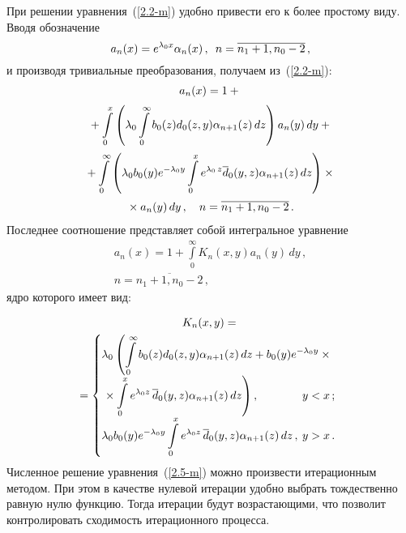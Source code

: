 \begin{multicols}{2}
При решении уравнения~(\ref{2.2-m}) удобно привести его
к более простому виду. Вводя обозначение
\begin{equation*}
a_{n}(x) = e^{\lambda_0 x} \alpha_{n}(x)\,,
\enskip  n=\overline{n_1+1,n_0-2}\,,
\end{equation*}
и производя тривиальные преобразования, получаем из~(\ref{2.2-m}):
\begin{multline}
\label{2.4-m}
a_{n}(x) = 1 +{}\\[2pt]
{}+ \int\limits_0^x \left(
\lambda_0 \int\limits_0^\infty b_0(z) d_0(z,y) \alpha_{n+1}(z)\, dz \right)
a_{n}(y)\, dy + {}\\[2pt]
{}+ \int\limits_0^\infty \left(
\lambda_0 b_0(y) e^{-\lambda_0 y} \int\limits_0^x e^{\lambda_0\, z} \overline d_0(y,z) \alpha_{n+1}(z)\,dz
\right)\times{}\\[2pt]
{}\times  a_{n}(y) \, dy\,,
\quad n=\overline{n_1+1,n_0-2}\,.
\end{multline}
Последнее соотношение представляет собой интегральное уравнение
\begin{multline}
\label{2.5-m}
a_n(x) = 1 + \int\limits_0^\infty K_n(x,y) a_{n}(y) \, dy\,,
\\[2pt]
 n=\overline{n_1+1,n_0-2}\,, 
\end{multline}
ядро которого имеет вид:

\noindent
\begin{multline*}
K_n(x,y) ={}\\
\hspace*{-7.92743pt}{}=
\begin{cases}
\displaystyle\lambda_0 \left( \int\limits_0^\infty
b_0(z) d_0(z,y) \alpha_{n+1}(z)\, dz+
b_0(y) e^{-\lambda_0 y}\times{}\right.\\
\left.\displaystyle{}\times \int\limits_0^x e^{\lambda_0 z}\, \d_0(y,z)
\alpha_{n+1}(z) \,dz \vphantom{\int\limits^\infty_0}\right),                     &\hspace*{-38pt}y<x\,;     \\
\displaystyle\lambda_0 b_0(y) e^{-\lambda_0 y}
\int\limits_0^x e^{\lambda_0 z} \,\d_0(y,z)
\alpha_{n+1}(z) \,dz\,,                         &\hspace*{-38pt}y>x\,.
\end{cases}
\end{multline*}
Численное решение уравнения~(\ref{2.5-m}) можно произ\-вес\-ти итерационным методом.
При этом в качестве нулевой итерации удобно выбрать тождественно равную нулю функцию.
Тогда итерации будут возрастающими, что позволит контролировать сходимость 
итерационного процесса.


\end{multicols}
